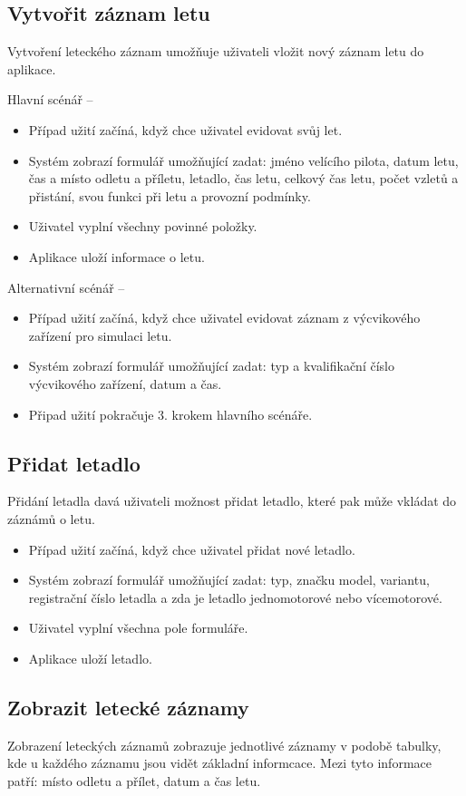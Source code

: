 \subsection{Vytvořit záznam letu}
Vytvoření leteckého záznam umožňuje uživateli vložit nový záznam letu do aplikace.

Hlavní scénář --
\begin{itemize}
\item Případ užití začíná, když chce uživatel evidovat svůj let.
\item Systém zobrazí formulář umožňující zadat: jméno velícího pilota, datum letu, čas a místo odletu a příletu, letadlo, čas letu, celkový čas letu, počet vzletů a přistání, svou funkci při letu a provozní podmínky.
\item Uživatel vyplní všechny povinné položky.
\item Aplikace uloží informace o letu.
\end{itemize}

Alternativní scénář --
\begin{itemize}
\item Případ užití začíná, když chce uživatel evidovat záznam z výcvikového zařízení pro simulaci letu.
\item Systém zobrazí formulář  umožňující zadat: typ a kvalifikační číslo výcvikového zařízení, datum a čas.
\item Připad užití pokračuje 3. krokem hlavního scénáře.
\end{itemize}

\subsection{Přidat letadlo}
Přidání letadla davá uživateli možnost přidat letadlo, které pak může vkládat do záznámů o letu.

\begin{itemize}
\item Případ užití začíná, když chce uživatel přidat nové letadlo.
\item Systém zobrazí formulář  umožňující zadat: typ, značku model, variantu, registrační číslo letadla a zda je letadlo jednomotorové nebo vícemotorové.
\item Uživatel vyplní všechna pole formuláře.
\item Aplikace uloží letadlo.
\end{itemize}

\subsection{Zobrazit letecké záznamy}
Zobrazení leteckých záznamů zobrazuje jednotlivé záznamy v podobě tabulky, kde u každého záznamu jsou vidět základní informcace. Mezi tyto informace patří: místo odletu a přílet, datum a čas letu.


